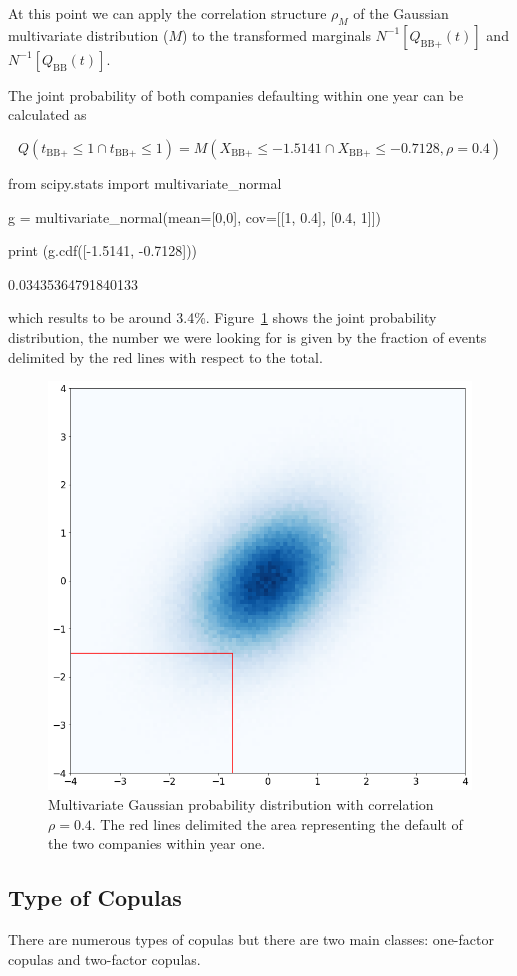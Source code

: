At this point we can apply the correlation structure $\rho_M$ of the Gaussian multivariate distribution ($M$) to the transformed marginals $N^{-1}[Q_{\textrm{BB+}}(t)]$ and $N^{-1}[Q_{\textrm{BB}}(t)]$.

The joint probability of both companies defaulting within one year can be calculated as

\begin{equation*}
Q(t_{\textrm{BB+}}\leq 1 \cap t_{\textrm{BB+}}\leq 1) = M(X_{\textrm{BB+}}\leq -1.5141 \cap X_{\textrm{BB+}}\leq -0.7128, \rho=0.4)
\end{equation*}

\begin{ipython}
from scipy.stats import multivariate_normal

g = multivariate_normal(mean=[0,0],
                        cov=[[1, 0.4],
                             [0.4, 1]])

print (g.cdf([-1.5141, -0.7128]))
\end{ipython}
\begin{ioutput}
0.03435364791840133
\end{ioutput}
\noindent
which results to be around 3.4\%. Figure~\ref{fig:copula_no_marginals} shows the joint probability distribution, the number we were looking for is given by the fraction of events delimited by the red lines with respect to the total.

\begin{figure}[htbp]
\centering
\includegraphics[width=0.5\linewidth]{figures/copula_no_marginals}
\caption{Multivariate Gaussian probability distribution with correlation $\rho=0.4$. The red lines delimited the area representing the default of the two companies within year one.}
\label{fig:copula_no_marginals}
\end{figure}

\subsection{Type of Copulas}
There are numerous types of copulas but there are two main classes: one-factor copulas and two-factor copulas.

